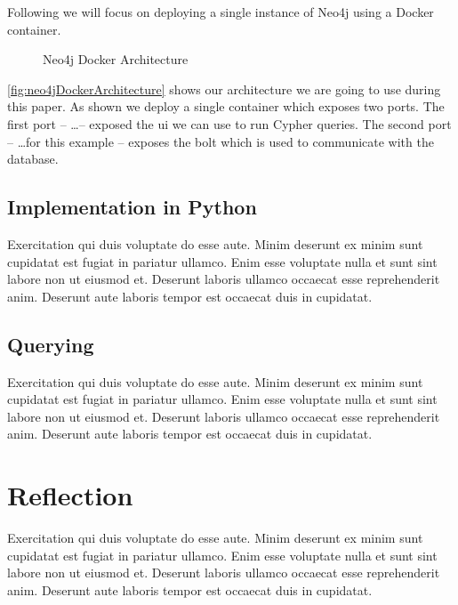 Following we will focus on deploying a single instance of Neo4j using a Docker container. 

\begin{figure}[H]
    \caption{Neo4j Docker Architecture} \label{fig:neo4jDockerArchitecture}
\end{figure}


\autoref{fig:neo4jDockerArchitecture} shows our architecture we are going to use during this paper. As shown we deploy a single container which exposes two ports. The first port -- \dots -- exposed the \ac{ui} we can use to run Cypher queries. The second port -- \dots for this example -- exposes the \ac{bolt} which is used to communicate with the database.

\subsection{Implementation in Python} \label{subsec:implementationPythonNeo4j}

Exercitation qui duis voluptate do esse aute. Minim deserunt ex minim sunt cupidatat est fugiat in pariatur ullamco. Enim esse voluptate nulla et sunt sint labore non ut eiusmod et. Deserunt laboris ullamco occaecat esse reprehenderit anim. Deserunt aute laboris tempor est occaecat duis in cupidatat.

\subsection{Querying} \label{subsec:queryingNeo4j}

Exercitation qui duis voluptate do esse aute. Minim deserunt ex minim sunt cupidatat est fugiat in pariatur ullamco. Enim esse voluptate nulla et sunt sint labore non ut eiusmod et. Deserunt laboris ullamco occaecat esse reprehenderit anim. Deserunt aute laboris tempor est occaecat duis in cupidatat.

\section{Reflection} \label{sec:reflectionNeo4j}

Exercitation qui duis voluptate do esse aute. Minim deserunt ex minim sunt cupidatat est fugiat in pariatur ullamco. Enim esse voluptate nulla et sunt sint labore non ut eiusmod et. Deserunt laboris ullamco occaecat esse reprehenderit anim. Deserunt aute laboris tempor est occaecat duis in cupidatat.

